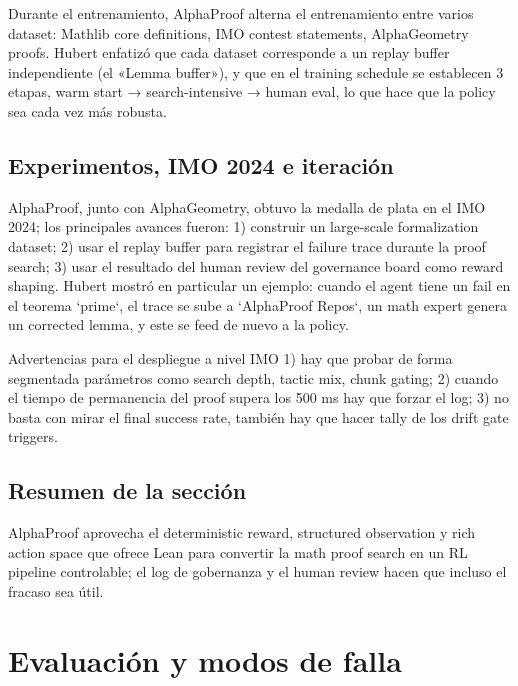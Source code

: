 \documentclass[a4paper]{article}
\begin{document}
Durante el entrenamiento, AlphaProof alterna el entrenamiento entre varios dataset: Mathlib core definitions, IMO contest statements, AlphaGeometry proofs. Hubert enfatizó que cada dataset corresponde a un replay buffer independiente (el «Lemma buffer»), y que en el training schedule se establecen 3 etapas, warm start → search-intensive → human eval, lo que hace que la policy sea cada vez más robusta.

\subsection{Experimentos, IMO 2024 e iteración}
AlphaProof, junto con AlphaGeometry, obtuvo la medalla de plata en el IMO 2024; los principales avances fueron: 1) construir un large-scale formalization dataset; 2) usar el replay buffer para registrar el failure trace durante la proof search; 3) usar el resultado del human review del governance board como reward shaping. Hubert mostró en particular un ejemplo: cuando el agent tiene un fail en el teorema `prime`, el trace se sube a `AlphaProof Repos`, un math expert genera un corrected lemma, y este se feed de nuevo a la policy.
\begin{warningbox}{Advertencias para el despliegue a nivel IMO}
1) hay que probar de forma segmentada parámetros como search depth, tactic mix, chunk gating; 2) cuando el tiempo de permanencia del proof supera los 500 ms hay que forzar el log; 3) no basta con mirar el final success rate, también hay que hacer tally de los drift gate triggers.
\end{warningbox}

\subsection{Resumen de la sección}
AlphaProof aprovecha el deterministic reward, structured observation y rich action space que ofrece Lean para convertir la math proof search en un RL pipeline controlable; el log de gobernanza y el human review hacen que incluso el fracaso sea útil.
\newpage

\section{Evaluación y modos de falla}
\end{document}
